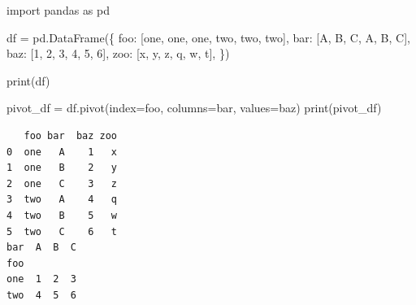 \documentclass[
  polish,
  letterpaper,
  DIV=11,
  numbers=noendperiod]{scrreprt}
\newenvironment{Shaded}{\begin{snugshade}}{\end{snugshade}}
\newcommand{\BuiltInTok}[1]{\textcolor[rgb]{0.00,0.23,0.31}{#1}}
\newcommand{\DecValTok}[1]{\textcolor[rgb]{0.68,0.00,0.00}{#1}}
\newcommand{\ImportTok}[1]{\textcolor[rgb]{0.00,0.46,0.62}{#1}}
\newcommand{\NormalTok}[1]{\textcolor[rgb]{0.00,0.23,0.31}{#1}}
\newcommand{\OperatorTok}[1]{\textcolor[rgb]{0.37,0.37,0.37}{#1}}
\newcommand{\StringTok}[1]{\textcolor[rgb]{0.13,0.47,0.30}{#1}}
\begin{document}
\begin{Shaded}
\begin{Highlighting}[]
\ImportTok{import}\NormalTok{ pandas }\ImportTok{as}\NormalTok{ pd}

\NormalTok{df }\OperatorTok{=}\NormalTok{ pd.DataFrame(\{}
    \StringTok{\textquotesingle{}foo\textquotesingle{}}\NormalTok{: [}\StringTok{\textquotesingle{}one\textquotesingle{}}\NormalTok{, }\StringTok{\textquotesingle{}one\textquotesingle{}}\NormalTok{, }\StringTok{\textquotesingle{}one\textquotesingle{}}\NormalTok{, }\StringTok{\textquotesingle{}two\textquotesingle{}}\NormalTok{, }\StringTok{\textquotesingle{}two\textquotesingle{}}\NormalTok{, }\StringTok{\textquotesingle{}two\textquotesingle{}}\NormalTok{],}
    \StringTok{\textquotesingle{}bar\textquotesingle{}}\NormalTok{: [}\StringTok{\textquotesingle{}A\textquotesingle{}}\NormalTok{, }\StringTok{\textquotesingle{}B\textquotesingle{}}\NormalTok{, }\StringTok{\textquotesingle{}C\textquotesingle{}}\NormalTok{, }\StringTok{\textquotesingle{}A\textquotesingle{}}\NormalTok{, }\StringTok{\textquotesingle{}B\textquotesingle{}}\NormalTok{, }\StringTok{\textquotesingle{}C\textquotesingle{}}\NormalTok{],}
    \StringTok{\textquotesingle{}baz\textquotesingle{}}\NormalTok{: [}\DecValTok{1}\NormalTok{, }\DecValTok{2}\NormalTok{, }\DecValTok{3}\NormalTok{, }\DecValTok{4}\NormalTok{, }\DecValTok{5}\NormalTok{, }\DecValTok{6}\NormalTok{],}
    \StringTok{\textquotesingle{}zoo\textquotesingle{}}\NormalTok{: [}\StringTok{\textquotesingle{}x\textquotesingle{}}\NormalTok{, }\StringTok{\textquotesingle{}y\textquotesingle{}}\NormalTok{, }\StringTok{\textquotesingle{}z\textquotesingle{}}\NormalTok{, }\StringTok{\textquotesingle{}q\textquotesingle{}}\NormalTok{, }\StringTok{\textquotesingle{}w\textquotesingle{}}\NormalTok{, }\StringTok{\textquotesingle{}t\textquotesingle{}}\NormalTok{],}
\NormalTok{\})}

\BuiltInTok{print}\NormalTok{(df)}

\NormalTok{pivot\_df }\OperatorTok{=}\NormalTok{ df.pivot(index}\OperatorTok{=}\StringTok{\textquotesingle{}foo\textquotesingle{}}\NormalTok{, columns}\OperatorTok{=}\StringTok{\textquotesingle{}bar\textquotesingle{}}\NormalTok{, values}\OperatorTok{=}\StringTok{\textquotesingle{}baz\textquotesingle{}}\NormalTok{)}
\BuiltInTok{print}\NormalTok{(pivot\_df)}
\end{Highlighting}
\end{Shaded}

\begin{verbatim}
   foo bar  baz zoo
0  one   A    1   x
1  one   B    2   y
2  one   C    3   z
3  two   A    4   q
4  two   B    5   w
5  two   C    6   t
bar  A  B  C
foo         
one  1  2  3
two  4  5  6
\end{verbatim}
\end{document}
